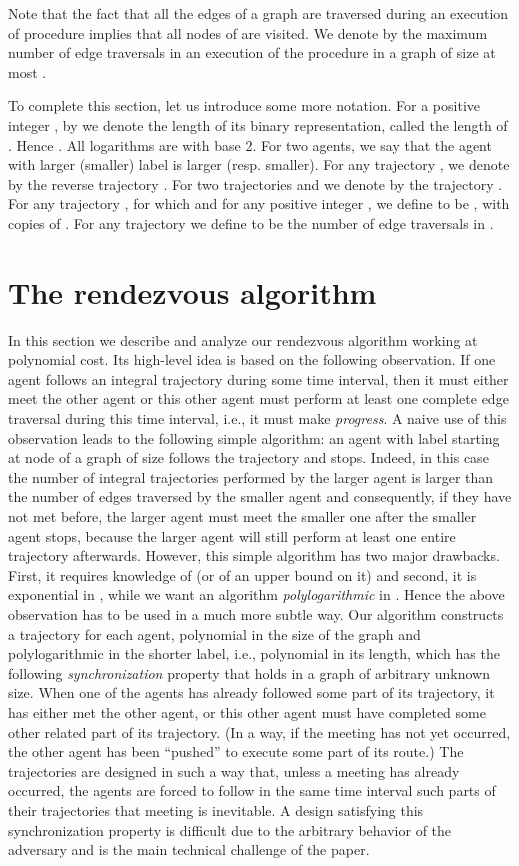 \documentclass [11pt] {article}
\begin{document}
{Note that the fact that all the edges of a graph  are traversed during an execution of procedure  implies that all nodes of  are visited.}
We denote by  the maximum number of edge traversals in an execution of the procedure 
in a graph of size at most .

{To complete this section, let us introduce some more notation.} For a positive integer , by  we denote the length of its binary representation, called the length of . Hence . All logarithms are with base 2.
For two agents, we say that the agent with larger (smaller) label is larger (resp. smaller). For any trajectory , we denote by   the reverse trajectory . For two trajectories  and  we denote by  the trajectory 
. For any trajectory , for which  and for any positive integer , we define  to be , 
with  copies of .
For any trajectory  we define  to be the number of {edge traversals} in .

\section{The rendezvous algorithm}

In this section we describe and analyze our rendezvous algorithm working at polynomial cost. Its high-level idea is based on the following observation.
If one agent follows an integral trajectory during some time interval, then it must either meet the other agent or this other agent must perform at least one complete edge traversal during this time
interval, i.e., it must make {\em progress}.  
A naive use of this observation leads to the following simple algorithm: an agent with label  starting at node  of a graph of size  follows the trajectory 
and stops.
Indeed, in this case the number of integral trajectories  performed by the larger agent is larger than the number of edges traversed by the smaller agent and consequently, if they have not met before,  the larger agent must meet the smaller one after the smaller agent stops, because the larger agent will still perform at least one entire trajectory afterwards.
However,  this simple algorithm has two major drawbacks.
First, it requires knowledge of  (or of an upper bound on it) and second, it is exponential in , while we want an algorithm {\em polylogarithmic} in . Hence the above observation has to be used in a much more subtle way. Our algorithm constructs a trajectory for each agent, polynomial in the size of the graph and polylogarithmic in the shorter label, i.e., polynomial in its length, which has the following {\em synchronization} property that holds in a graph of arbitrary unknown size. 
When one of the agents has already followed some part of its trajectory, it has either met the other agent, or this other agent must have completed
some other related part of its trajectory. (In a way, if the meeting has not yet occurred, the other agent has been ``pushed'' to execute some part of its route.) The trajectories are designed in such a way
that, unless a meeting has already occurred, the agents are forced to follow in the same time interval such parts of their trajectories that meeting is inevitable. A design satisfying this
synchronization property is difficult due to the arbitrary behavior of the adversary and is the main technical challenge of the paper.
\end{document}
